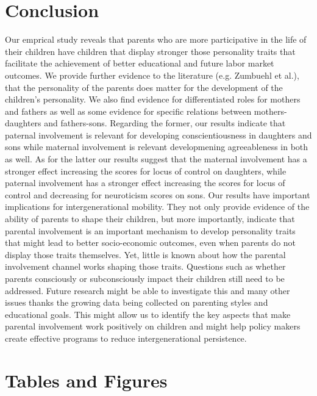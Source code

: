 \documentclass[%
    a4paper,            %
    11pt,               %
    bibliography=totoc, %
]
{scrartcl}
\begin{document}
\section{Conclusion}
Our emprical study reveals that parents who are more participative in the life of their children have children that display stronger those personality traits that facilitate the achievement of better educational and future labor market outcomes. We provide further evidence to the literature (e.g. Zumbuehl et al.), that the personality of the parents does matter for the development of the children's personality. We also find evidence for differentiated roles for mothers and fathers as well as some evidence for specific relations between mothers-daughters and fathers-sons. Regarding the former, our results indicate that paternal involvement is relevant for developing conscientiousness in daughters and sons while maternal involvement is relevant developmening agreeableness in both as well. As for the latter our results suggest that the maternal involvement has a stronger effect increasing the scores for locus of control on daughters, while paternal involvement has a stronger effect increasing the scores for locus of control and decreasing for neuroticism scores on sons. \newline
Our results have important implications for intergenerational mobility. They not only provide evidence of the ability of parents to shape their children, but more importantly, indicate that parental involvement is an important mechanism to develop personality traits that might lead to better socio-economic outcomes, even when parents do not display those traits themselves. \newline 
Yet, little is known about how the parental involvement channel works shaping those traits. Questions such as whether parents consciously or subconsciously impact their children still need to be addressed. Future research might be able to investigate this and many other issues thanks the growing data being collected on parenting styles and educational goals. This might allow us to identify the key aspects that make parental involvement work positively on children and might help policy makers create effective programs to reduce intergenerational persistence.







\pagebreak
\section{Tables and Figures}
\end{document}

